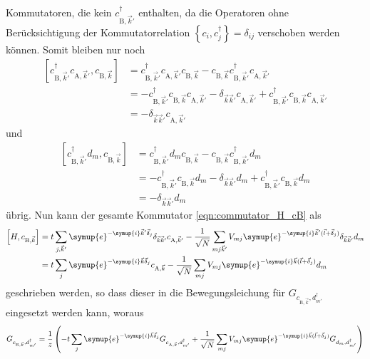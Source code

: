 Kommutatoren, die kein $c^\dagger_{\text{B},\vec{k}'}$ enthalten, da die Operatoren ohne Berücksichtigung der Kommutatorrelation 
$\left \{ c_i, c^\dagger_j \right \} = \delta_{ij}$ verschoben werden können.
Somit bleiben nur noch 
\begin{align*}
    \left [ c^\dagger_{\text{B},\vec{k}'} c_{\text{A},\vec{k}'}, c_{\text{B},\vec{k}} \right ]
        &= c^\dagger_{\text{B},\vec{k}'} c_{\text{A},\vec{k}'} c_{\text{B},\vec{k}} - c_{\text{B},\vec{k}} c^\dagger_{\text{B},\vec{k}'} c_{\text{A},\vec{k}'} \\
        &= - c^\dagger_{\text{B},\vec{k}'} c_{\text{B},\vec{k}} c_{\text{A},\vec{k}'} - \delta_{\vec{k}\vec{k}'} c_{\text{A},\vec{k}'}
        + c^\dagger_{\text{B},\vec{k}'} c_{\text{B},\vec{k}} c_{\text{A},\vec{k}'} \\
        &=  - \delta_{\vec{k}\vec{k}'} c_{\text{A},\vec{k}'}
\end{align*}
und 
\begin{align*}
    \left [ c^\dagger_{\text{B},\vec{k}'} d_m, c_{\text{B},\vec{k}} \right ] &=
        c^\dagger_{\text{B},\vec{k}'} d_m c_{\text{B},\vec{k}} - c_{\text{B},\vec{k}} c^\dagger_{\text{B},\vec{k}'} d_m \\
        &= - c^\dagger_{\text{B},\vec{k}'} c_{\text{B},\vec{k}} d_m - \delta_{\vec{k}\vec{k}'} d_m + c^\dagger_{\text{B},\vec{k}'} c_{\text{B},\vec{k}} d_m \\
        &= - \delta_{\vec{k}\vec{k}'} d_m
\end{align*}
übrig.
Nun kann der gesamte Kommutator \eqref{eqn:commutator_H_cB} als 
\begin{align*}
    \left [ H, c_{\text{B},\vec{k}} \right ]
     &= t \sum_{j,\vec{k}'} \symup{e}^{-\symup{i}\vec{k}' \vec{\delta}_j} \delta_{\vec{k}\vec{k}'} c_{\text{A},\vec{k}'}
      - \frac{1}{\sqrt{N}}\sum_{mj\vec{k}'} V_{mj} \symup{e}^{-\symup{i}\vec{k}' (\vec{l} + \vec{\delta}_j)} \delta_{\vec{k}\vec{k}'} d_m  \\
     &=  t \sum_{j} \symup{e}^{-\symup{i}\vec{k} \vec{\delta}_j} c_{\text{A},\vec{k}}
     - \frac{1}{\sqrt{N}}\sum_{mj} V_{mj} \symup{e}^{-\symup{i}\vec{k} (\vec{l} + \vec{\delta}_j)} d_m
\end{align*}
geschrieben werden, so dass dieser in die Bewegungsleichung für $G_{c_{\text{B},\vec{k}}, d^\dagger_{m'}}$ eingesetzt werden kann, woraus
\begin{align}
    G_{c_{\text{B},\vec{k}}, d^\dagger_{m'}} =\frac{1}{z} \left (- t \sum_{j} \symup{e}^{-\symup{i}\vec{k} \vec{\delta}_j} G_{c_{\text{A},\vec{k}},d^\dagger_{m'}} + 
    \frac{1}{\sqrt{N}} \sum_{mj} V_{mj} \symup{e}^{-\symup{i}\vec{k} (\vec{l}+ \vec{\delta}_j)} G_{d_m, d_{m'}^\dagger} \right )  \label{eqn:greensfunction_cB}
\end{align}
